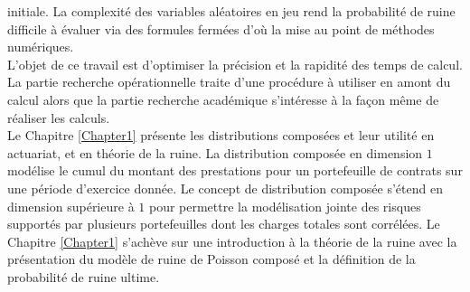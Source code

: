 initiale. La complexité des variables aléatoires en jeu rend la probabilité de ruine difficile à évaluer via des formules fermées d'où la mise au point de méthodes numériques.\\

L'objet de ce travail est d'optimiser la précision et la rapidité des temps de calcul. La partie recherche opérationnelle traite d\rq{}une procédure à utiliser en amont du calcul alors que la partie recherche académique s\rq{}intéresse à la façon même de réaliser les calculs.\\

Le Chapitre \ref{Chapter1} présente les distributions composées et leur utilité en actuariat, et en théorie de la ruine. La distribution composée en dimension $1$ modélise le cumul du montant des prestations pour un portefeuille de contrats sur une période d'exercice donnée. Le concept de distribution composée s\rq{}étend en dimension supérieure à $1$ pour permettre la modélisation jointe des risques supportés par plusieurs portefeuilles dont les charges totales sont corrélées. Le Chapitre \ref{Chapter1} s'achève sur une introduction à la théorie de la ruine avec la présentation du modèle de ruine de Poisson composé et la définition de la probabilité de ruine ultime.\\

